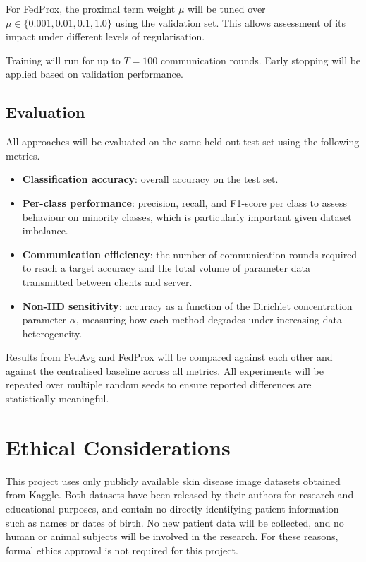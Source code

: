 \documentclass[12pt,openany,a4paper]{book}
\begin{document}
For FedProx, the proximal term weight $\mu$ will be tuned over $\mu \in \{0.001, 0.01, 0.1, 1.0\}$ using the validation set. This allows assessment of its impact under different levels of regularisation.

Training will run for up to $T = 100$ communication rounds. Early stopping will be applied based on validation performance.

\subsection{Evaluation}

All approaches will be evaluated on the same held-out test set using the following metrics.

\begin{itemize}
  \item \textbf{Classification accuracy}: overall accuracy on the test set.
  \item \textbf{Per-class performance}: precision, recall, and F1-score per class to assess behaviour on minority classes, which is particularly important given dataset imbalance.
  \item \textbf{Communication efficiency}: the number of communication rounds required to reach a target accuracy and the total volume of parameter data transmitted between clients and server.
  \item \textbf{Non-IID sensitivity}: accuracy as a function of the Dirichlet concentration parameter $\alpha$, measuring how each method degrades under increasing data heterogeneity.
\end{itemize}
Results from FedAvg and FedProx will be compared against each other and against the centralised baseline across all metrics. All experiments will be repeated over multiple random seeds to ensure reported differences are statistically meaningful.

\section{Ethical Considerations}
This project uses only publicly available skin disease image datasets obtained from Kaggle. Both datasets have been released by their authors for research and educational purposes, and contain no directly identifying patient information such as names or dates of birth. No new patient data will be collected, and no human or animal subjects will be involved in the research. For these reasons, formal ethics approval is not required for this project.
\end{document}
